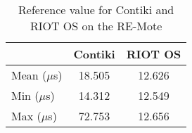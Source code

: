 \begin{table}[!ht]
  \centering
  \begin{tabular}{l|c|c}
       & Contiki & RIOT OS \\ \hline
  Mean ($\mu$s) & 18.505 & 12.626 \\
  Min  ($\mu$s) & 14.312 & 12.549 \\
  Max  ($\mu$s) & 72.753   & 12.656
  \end{tabular}
  \caption{Reference value for Contiki and RIOT OS on the RE-Mote}
  \label{tab:reference-value-remote}
  \end{table}